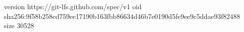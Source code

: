 version https://git-lfs.github.com/spec/v1
oid sha256:9f58b258cd759ee17190b163fbb86634d46b7e0190d5fe9ee9c5ddae93f82488
size 30528
